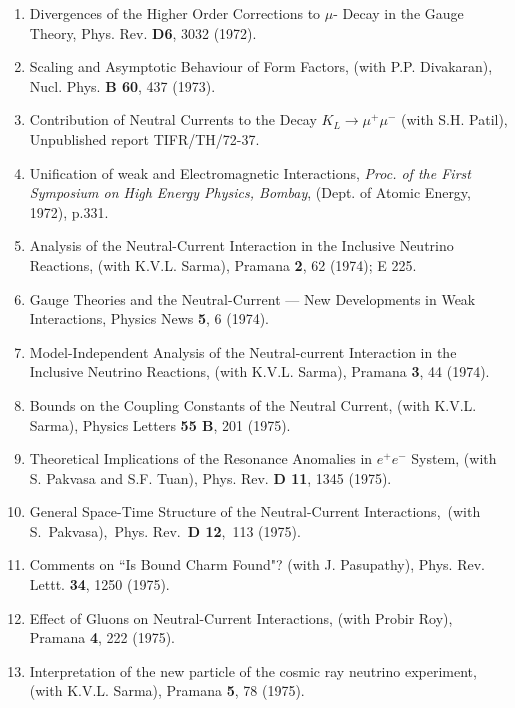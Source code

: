 \begin{enumerate}
\item Divergences of the Higher Order Corrections to $\mu$- Decay in the
Gauge Theory, Phys. Rev. {\bf D6}, 3032 (1972).

\item Scaling and Asymptotic Behaviour of Form Factors, (with P.P.
Divakaran), Nucl. Phys. {\bf B 60}, 437 (1973).

\item Contribution of Neutral Currents to the Decay $K_L \rightarrow
\mu^+ \mu^-$ (with S.H. Patil), Unpublished report TIFR/TH/72-37.

\item Unification of weak and Electromagnetic Interactions, {\it Proc. of the
First Symposium on High Energy Physics, Bombay}, (Dept. of Atomic
Energy, 1972), p.331.

\item Analysis of the Neutral-Current Interaction in the Inclusive
Neutrino Reactions, (with K.V.L. Sarma), Pramana {\bf 2}, 62 (1974); E 225.

\item Gauge Theories and the Neutral-Current --- New Developments in Weak
Interactions,  Physics News {\bf 5}, 6 (1974).

\item Model-Independent Analysis of the Neutral-current Inte\-raction in
the Inclusive Neutrino Reactions, (with K.V.L. Sarma), Pramana {\bf 3}, 
44 (1974).

\item Bounds on the Coupling Constants of the Neutral Current, (with
K.V.L. Sarma), Physics Letters {\bf 55 B}, 201 (1975).

\item Theoretical Implications of the Resonance Anomalies in $e^+ e^-$
System, (with S. Pakvasa and S.F. Tuan), Phys. Rev. {\bf D 11}, 1345 (1975).

\item General Space-Time Structure of the Neutral-Current Interactions,\ 
(with S.\ Pakvasa),\ Phys. Rev.\ {\bf D 12},\ 113 (1975).

\item Comments on ``Is Bound Charm Found"? (with J. Pasu\-pathy), 
Phys. Rev. Lettt. {\bf 34}, 1250 (1975).

\item Effect of Gluons on Neutral-Current Interactions, (with Probir
Roy), Pramana {\bf 4}, 222 (1975).

\item Interpretation of the new particle of the cosmic ray neutri\-no
experiment, (with K.V.L. Sarma), Pramana {\bf 5}, 78 (1975).


\end{enumerate}
